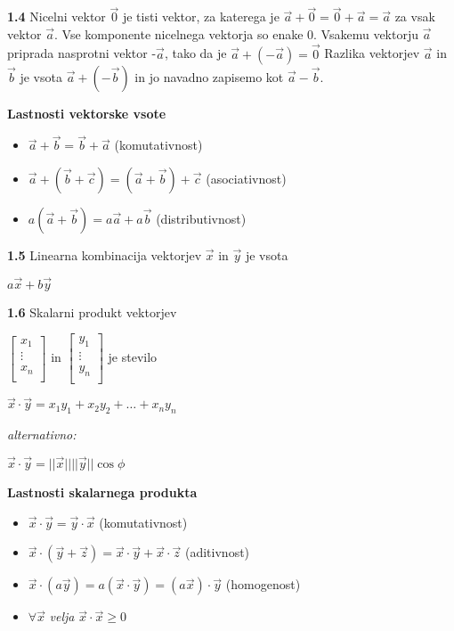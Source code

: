 \documentclass{article}
\begin{document}
\begin{multicols}{3}
\textbf{1.4} Nicelni vektor $\vec{0}$ je tisti vektor, za katerega
je $\vec{a} + \vec{0} = \vec{0} + \vec{a} = \vec{a}$ za vsak vektor
$\vec{a}$. Vse komponente nicelnega vektorja so enake 0. Vsakemu vektorju
$\vec{a}$ priprada nasprotni vektor -$\vec{a}$, tako da je $\vec{a} + (-\vec{a}) = \vec{0}$
Razlika vektorjev $\vec{a}$ in $\vec{b}$ je vsota $\vec{a} + (-\vec{b})$ in jo
navadno zapisemo kot  $\vec{a} - \vec{b}$.

\textbf{Lastnosti vektorske vsote}
\begin{itemize}
    \item $\vec{a} + \vec{b} = \vec{b} + \vec{a}$ (komutativnost)
    \item $\vec{a} + (\vec{b} + \vec{c}) = (\vec{a} + \vec{b}) + \vec{c}$ (asociativnost)
    \item $a(\vec{a} + \vec{b}) = a\vec{a} + a\vec{b}$ (distributivnost)
\end{itemize}

\textbf{1.5} Linearna kombinacija vektorjev $\vec{x}$ in $\vec{y}$ je vsota
\begin{center}
    $a\vec{x} + b\vec{y}$
\end{center}

\textbf{1.6} Skalarni produkt vektorjev\\
\begin{center}
    $\begin{bmatrix} 
        x_{1}\\ 
        \vdots\\ 
        x_{n}\\
    \end{bmatrix}$ in
    $\begin{bmatrix} 
        y_{1}\\ 
        \vdots\\ 
        y_{n}\\
    \end{bmatrix}$ je stevilo    
\end{center}
\begin{center}
    $\vec{x} \cdot \vec{y} = x_{1}y_{1} + x_{2}y_{2} + \dots + x_{n}y_{n}$
\end{center} \textit{alternativno:}
\begin{center}
    $\vec{x} \cdot \vec{y} = ||\vec{x}|| ||\vec{y}|| \cos \phi$
\end{center}

\textbf{Lastnosti skalarnega produkta}
\begin{itemize}
    \item $\vec{x} \cdot \vec{y} = \vec{y} \cdot \vec{x}$ (komutativnost)
    \item $\vec{x} \cdot (\vec{y} + \vec{z}) = \vec{x} \cdot \vec{y} + \vec{x} \cdot \vec{z}$ (aditivnost)
    \item $\vec{x} \cdot (a \vec{y}) = a(\vec{x} \cdot \vec{y}) = (a \vec{x}) \cdot \vec{y}$ (homogenost)
    \item $\forall \vec{x}$ \textit{velja} $\vec{x} \cdot \vec{x} \geq 0$
\end{itemize}


\end{multicols}
\end{document}
